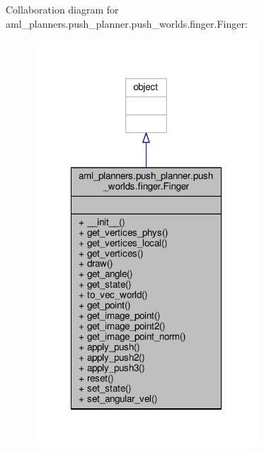 Collaboration diagram for aml\-\_\-planners.\-push\-\_\-planner.\-push\-\_\-worlds.\-finger.\-Finger\-:
\nopagebreak
\begin{figure}[H]
\begin{center}
\leavevmode
\includegraphics[width=238pt]{classaml__planners_1_1push__planner_1_1push__worlds_1_1finger_1_1_finger__coll__graph}
\end{center}
\end{figure}
